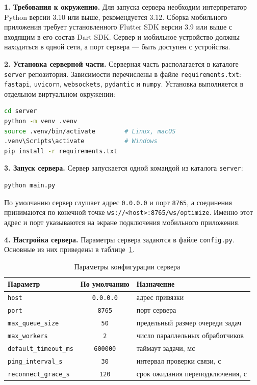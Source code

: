 \documentclass[14pt, a4paper]{extarticle}
\begin{document}
\medskip
\textbf{1. Требования к окружению.} Для запуска сервера необходим интерпретатор
Python версии 3.10 или выше, рекомендуется 3.12. Сборка мобильного приложения
требует установленного Flutter SDK версии 3.9 или выше с входящим в его состав
Dart SDK. Сервер и мобильное устройство должны находиться в одной сети, а порт
сервера --- быть доступен с устройства.

\medskip
\textbf{2. Установка серверной части.} Серверная часть располагается в каталоге
\texttt{server} репозитория. Зависимости перечислены в файле
\texttt{requirements.txt}: \texttt{fastapi}, \texttt{uvicorn}, \texttt{websockets},
\texttt{pydantic} и \texttt{numpy}. Установка выполняется в отдельном виртуальном
окружении:

\begin{lstlisting}[language=bash]
cd server
python -m venv .venv
source .venv/bin/activate        # Linux, macOS
.venv\Scripts\activate           # Windows
pip install -r requirements.txt
\end{lstlisting}

\medskip
\textbf{3. Запуск сервера.} Сервер запускается одной командой из каталога
\texttt{server}:

\begin{lstlisting}[language=bash]
python main.py
\end{lstlisting}

По умолчанию сервер слушает адрес \texttt{0.0.0.0} и порт \texttt{8765}, а
соединения принимаются по конечной точке \texttt{ws://<host>:8765/ws/optimize}.
Именно этот адрес и порт указываются на экране подключения мобильного
приложения.

\medskip
\textbf{4. Настройка сервера.} Параметры сервера задаются в файле
\texttt{config.py}. Основные из них приведены в таблице~\ref{tab:admin-config}.

\begin{table}[H]
  \centering
  \caption{Параметры конфигурации сервера}
  \label{tab:admin-config}
  \begin{tabular}{|l|c|l|}
    \hline
    Параметр & По умолчанию & Назначение \\
    \hline
    \texttt{host} & \texttt{0.0.0.0} & адрес привязки \\
    \hline
    \texttt{port} & \texttt{8765} & порт сервера \\
    \hline
    \texttt{max\_queue\_size} & \texttt{50} & предельный размер очереди задач \\
    \hline
    \texttt{max\_workers} & \texttt{2} & число параллельных обработчиков \\
    \hline
    \texttt{default\_timeout\_ms} & \texttt{600000} & таймаут задачи, мс \\
    \hline
    \texttt{ping\_interval\_s} & \texttt{30} & интервал проверки связи, с \\
    \hline
    \texttt{reconnect\_grace\_s} & \texttt{120} & срок ожидания переподключения, с \\
    \hline
  \end{tabular}
\end{table}
\end{document}
